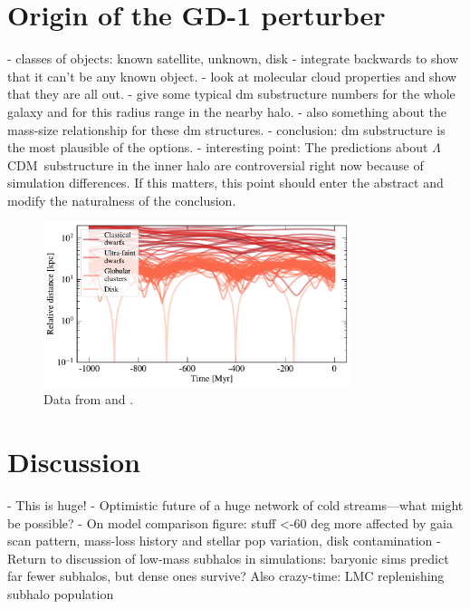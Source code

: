 \documentclass[12pt, modern]{aastex62}
\newcommand{\acronym}[1]{{\small{#1}}}
\newcommand{\lcdm}{\acronym{$\Lambda$CDM}}
\begin{document}

\section{Origin of the GD-1 perturber}
\label{sec:origin}
- classes of objects: known satellite, unknown, disk
- integrate backwards to show that it can't be any known object.
- look at molecular cloud properties and show that they are all out.
- give some typical dm substructure numbers for the whole galaxy and for this radius range in the nearby halo.
- also something about the mass-size relationship for these dm structures.
- conclusion: dm substructure is the most plausible of the options.
- interesting point: The predictions about \lcdm\ substructure in the inner halo are controversial right now because of simulation differences. If this matters, this point should enter the abstract and modify the naturalness of the conclusion.

\begin{figure}
\begin{center}
\includegraphics[width=0.8\textwidth]{satellite_distances.pdf}
\end{center}
\caption{Data from \citet{simon2018} and \citet{gdr2_satellites}.}
\label{fig:known_encounters}
\end{figure}

\section{Discussion}
- This is huge!
- Optimistic future of a huge network of cold streams---what might be possible?
- On model comparison figure: stuff <-60 deg more affected by gaia scan pattern, mass-loss history and stellar pop variation, disk contamination
- Return to discussion of low-mass subhalos in simulations: baryonic sims predict far fewer subhalos, but dense ones survive? Also crazy-time: LMC replenishing subhalo population
\end{document}
